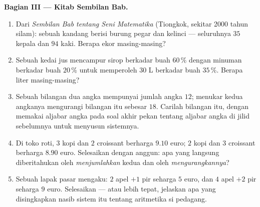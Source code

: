\begin{problem}
\medskip
\noindent\textbf{Bagian III --- Kitab Sembilan Bab.}
\begin{enumerate}[resume]
  \item Dari \emph{Sembilan Bab tentang Seni Matematika}
        (Tiongkok, sekitar 2000 tahun silam): sebuah kandang berisi burung
        pegar dan kelinci --- seluruhnya $35$ kepala dan $94$ kaki. Berapa
        ekor masing-masing?
  \item Sebuah kedai jus mencampur sirop berkadar buah $60\,\%$ dengan
        minuman berkadar buah $20\,\%$ untuk memperoleh $30$ L berkadar
        buah $35\,\%$. Berapa liter masing-masing?
  \item Sebuah bilangan dua angka mempunyai jumlah angka $12$; menukar kedua
        angkanya mengurangi bilangan itu sebesar $18$. Carilah bilangan itu,
        dengan memakai aljabar angka pada soal akhir pekan tentang aljabar
        angka di jilid sebelumnya untuk menyusun sistemnya.
  \item Di toko roti, $3$ kopi dan $2$ croissant berharga
        $9.10$ euro; $2$ kopi dan $3$ croissant berharga
        $8.90$ euro. Selesaikan dengan anggun: apa yang langsung diberitahukan
        oleh \emph{menjumlahkan} kedua  dan oleh
        \emph{mengurangkannya}?
  \item Sebuah lapak pasar mengaku: $2$ apel $+ 1$ pir seharga
        $5$ euro, dan $4$ apel $+ 2$ pir seharga $9$ euro.
        Selesaikan --- atau lebih tepat, jelaskan apa yang disingkapkan
        nasib sistem itu tentang aritmetika si pedagang.
\end{enumerate}


\end{problem}
